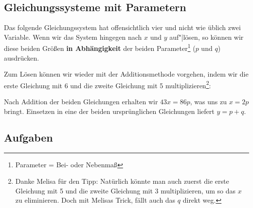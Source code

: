 \subsection{Gleichungssysteme mit Parametern}
Das folgende Gleichungssystem hat offensichtlich vier und nicht wie
üblich zwei Variable. Wenn wir das System hingegen nach $x$ und $y$
auf"|lösen, so können wir diese beiden Größen
\textbf{in Abhängigkeit} der beiden Parameter\footnote{Parameter =
  Bei- oder Nebenmaß} ($p$ und $q$) ausdrücken.


Zum Lösen können wir wieder mit der Additionsmethode vorgehen, indem
wir die erste Gleichung mit 6 und die zweite Gleichung mit 5 multiplizieren\footnote{Danke Melisa für den Tipp: Natürlich könnte man auch zuerst die erste Gleichung mit 5 und die zweite Gleichung mit 3 multiplizieren, um so das $x$ zu eliminieren. Doch mit Melisas Trick, fällt auch das $q$ direkt weg.
}:


Nach Addition der beiden Gleichungen erhalten wir $43x=86p$, was uns zu $x=2p$ bringt.
Einsetzen in eine der beiden ursprünglichen Gleichungen liefert $y=p+q$.

\subsection*{Aufgaben}
